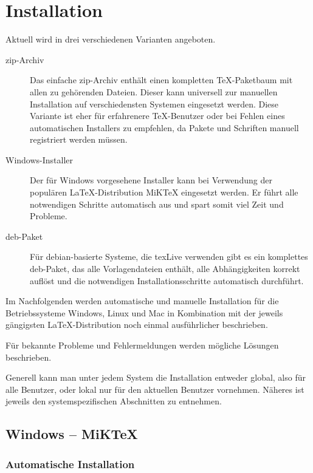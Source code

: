 \chapter{Installation}\label{sec:install}

Aktuell wird \tubslatex in drei verschiedenen Varianten angeboten.

\begin{description}
  \item[zip-Archiv]
    Das einfache zip-Archiv enthält einen kompletten \TeX-Paketbaum mit
    allen zu \tubslatex gehörenden Dateien.
    Dieser kann universell zur manuellen Installation auf verschiedensten
    Systemen eingesetzt werden.
    Diese Variante ist eher für erfahrenere \TeX-Benutzer oder bei
    Fehlen eines automatischen Installers zu empfehlen, da Pakete
    und Schriften manuell registriert werden müssen.
  \item[Windows-Installer]
    Der für Windows vorgesehene Installer kann bei Verwendung der
    populären \LaTeX-Distribution MiKTeX eingesetzt werden.
    Er führt alle notwendigen Schritte automatisch aus und spart somit
    viel Zeit und Probleme.
  \item[deb-Paket]
    Für debian-basierte Systeme, die texLive verwenden gibt es
    ein komplettes deb-Paket, das alle Vorlagendateien enthält,
    alle Abhängigkeiten korrekt auflöst und die notwendigen
    Installationsschritte automatisch durchführt.
\end{description}

Im Nachfolgenden werden automatische und manuelle Installation für
die Betriebssysteme Windows, Linux und Mac in Kombination mit der
jeweils gängigsten \LaTeX-Distribution noch einmal ausführlicher
beschrieben.

Für bekannte Probleme und Fehlermeldungen werden mögliche Lösungen beschrieben.

Generell kann man unter jedem System die Installation entweder global, 
also für alle Benutzer, oder lokal nur für den aktuellen Benutzer vornehmen.
Näheres ist jeweils den systemspezifischen Abschnitten zu entnehmen.


\clearpage
\section{Windows -- MiKTeX}

\subsection{Automatische Installation}

